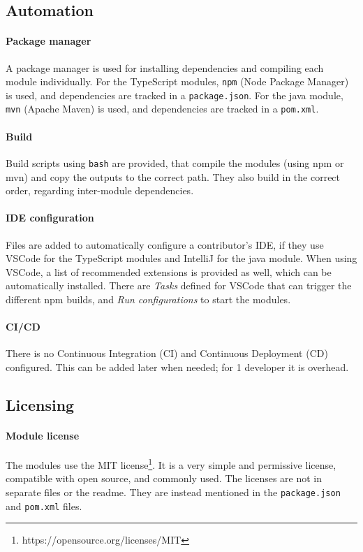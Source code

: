 \subsection{Automation}

\paragraph{Package manager}
A package manager is used for installing dependencies and compiling each module individually.
For the TypeScript modules, \texttt{npm} (Node Package Manager) is used, and dependencies are tracked in a \texttt{package.json}.
For the java module, \texttt{mvn} (Apache Maven) is used, and dependencies are tracked in a \texttt{pom.xml}.

\paragraph{Build}
Build scripts using \texttt{bash} are provided, that compile the modules (using npm or mvn) and copy the outputs to the correct path.
They also build in the correct order, regarding inter-module dependencies.

\paragraph{IDE configuration}
Files are added to automatically configure a contributor's \acrshort{IDE}, if they use \gls{VSCode} for the TypeScript modules and IntelliJ for the java module.
When using \gls{VSCode}, a list of recommended extensions is provided as well, which can be automatically installed.
There are \textit{Tasks} defined for \gls{VSCode} that can trigger the different npm builds, and \textit{Run configurations} to start the modules.

\paragraph{CI/CD}
There is no Continuous Integration (CI) and Continuous Deployment (CD) configured.
This can be added later when needed; for 1 developer it is overhead.

\subsection{Licensing}

\paragraph{Module license}
The modules use the MIT license\footnote{https://opensource.org/licenses/MIT}.
It is a very simple and permissive license, compatible with \gls{open source}, and commonly used.
The licenses are not in separate files or the readme.
They are instead mentioned in the \texttt{package.json} and \texttt{pom.xml} files.

